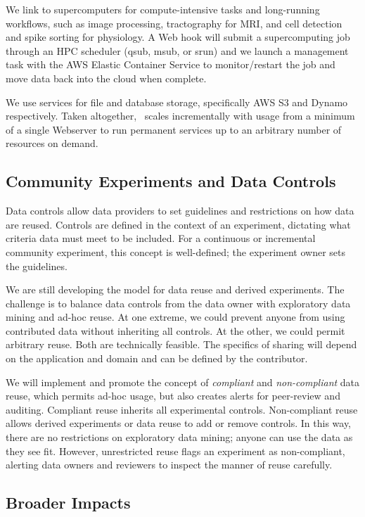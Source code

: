 We link to supercomputers for compute-intensive tasks and long-running workflows, 
such as image processing, tractography for MRI, and cell detection and spike sorting for physiology.  
A Web hook will submit a supercomputing job
through an HPC scheduler (qsub, msub, or srun) and we launch a management task with 
the AWS Elastic Container Service to monitor/restart the job and move data back into the cloud when complete.

We use services for file and database storage, specifically AWS S3 and Dynamo respectively.
% 
Taken altogether, \name~scales incrementally with usage from a minimum of 
a single Webserver to run permanent services up to an arbitrary number of resources on demand.


\subsection{Community Experiments and Data Controls}

Data controls allow data providers to set guidelines and restrictions on how data are reused.
Controls are defined in the context of an experiment, dictating what criteria data must meet 
to be included.  For a continuous or incremental community experiment, this concept is 
well-defined; the experiment owner sets the guidelines.

We are still developing the model for data reuse and derived experiments.  The challenge
is to balance data controls from the data owner with exploratory data mining and
ad-hoc reuse.  At one extreme, we could prevent anyone from using contributed data 
without inheriting all controls.  At the other, we could permit arbitrary reuse.  
Both are technically feasible.  The specifics of sharing will depend on the application
and domain and can be defined by the contributor.

We will implement and promote the concept of {\em compliant} and {\em non-compliant} data reuse, 
which permits ad-hoc usage, but also creates alerts for peer-review and auditing.
Compliant reuse inherits all experimental controls.  Non-compliant reuse allows derived
experiments or data reuse to add or remove controls.  In this way, there are no restrictions on 
exploratory data mining; anyone can use the data as they see fit.  However, unrestricted 
reuse flags an experiment as non-compliant, alerting data owners and reviewers to inspect 
the manner of reuse carefully.


\subsection{Broader Impacts}

